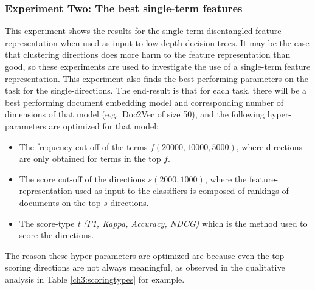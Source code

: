 \subsubsection{Experiment Two: The best single-term features}\label{ch3:ex2}

This  experiment shows the results for the single-term disentangled feature representation when used as input to low-depth decision trees. It may be the case that clustering directions does more harm to the feature representation than good, so these experiments are used to investigate the use of a single-term feature representation.  This experiment also finds  the best-performing parameters on the task for the single-directions. The end-result is that for each task, there will be a best performing document embedding model and corresponding number of dimensions of that model (e.g.\ Doc2Vec of size 50), and the following hyper-parameters are optimized for that model:

\begin{itemize}
	\item The frequency cut-off of the terms $f (20000, 10000, 5000) $, where directions are only obtained for terms in the top $f$.
	\item The score cut-off of the directions $s (2000, 1000)$, where the feature-representation used as input to the classifiers is composed of rankings of documents  on the top $s$ directions.
	\item The score-type \textit{t ({F1}, {Kappa}, {Accuracy}, {NDCG})} which is the method used to score the directions.
\end{itemize}

The reason these hyper-parameters are optimized are because even the top-scoring directions are not always meaningful, as  observed in the qualitative analysis in Table \ref{ch3:scoringtypes} for example.






